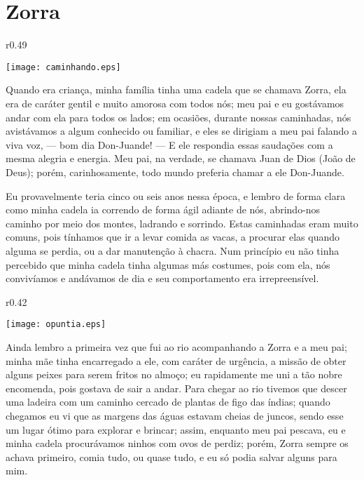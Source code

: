 \cleardoublepage
\newpage
{}
\chapter{Zorra}


\begin{wrapfigure}{r}{0.49\textwidth}
  \begin{center}
  \vspace{-30pt}
    \texttt{[image: caminhando.eps]}
  \end{center}
  \vspace{-20pt}
\end{wrapfigure}
Quando era criança, minha família tinha uma cadela que se chamava Zorra, ela era de caráter gentil e muito amorosa com todos nós; meu pai e eu gostávamos andar com ela para todos os lados; em ocasiões, durante nossas caminhadas, nós avistávamos a algum conhecido ou familiar, e eles se dirigiam a meu pai falando a viva voz, --- bom dia Don-Juande! --- E ele respondia essas saudações com a mesma alegria e energia.
Meu pai, na verdade, se chamava Juan de Dios (João de Deus); porém, carinhosamente, todo mundo preferia chamar a ele Don-Juande.


Eu provavelmente teria cinco ou seis anos nessa época, e lembro de forma clara como minha cadela ia correndo de forma ágil adiante de nós, abrindo-nos caminho por meio dos montes, ladrando e sorrindo.
Estas caminhadas eram muito comuns, pois tínhamos que ir a levar comida as vacas, a procurar elas quando alguma se perdia, ou a dar manutenção à chacra.
Num princípio eu não tinha percebido que minha cadela tinha algumas más costumes, pois com ela, nós convivíamos e andávamos de dia e seu comportamento era irrepreensível. 

\begin{wrapfigure}{r}{0.42\textwidth}
  \begin{center}
  \vspace{-30pt}
    \texttt{[image: opuntia.eps]}
  \end{center}
  \vspace{-20pt}
\end{wrapfigure}
Ainda lembro a primeira vez que fui ao rio acompanhando a Zorra e a meu pai; minha mãe tinha encarregado a ele, com caráter de urgência, a missão de obter alguns peixes para serem fritos no almoço; eu rapidamente me uni a tão nobre encomenda, pois gostava de sair a andar. 
Para chegar ao rio tivemos que descer uma ladeira com um caminho cercado de plantas de figo das índias; quando chegamos eu vi que as margens das águas estavam cheias de juncos, sendo esse um lugar ótimo para explorar e brincar; assim, enquanto meu pai pescava, eu e minha cadela procurávamos ninhos com ovos de perdiz; porém, Zorra sempre os achava primeiro, comia tudo, ou quase tudo, e eu só podia salvar alguns para mim.


